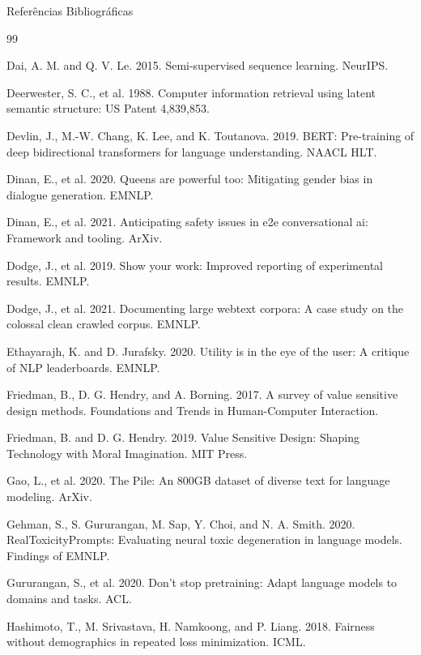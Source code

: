 \documentclass[aspectratio=169]{beamer}
\begin{document}
\begin{frame}[allowframebreaks]{Referências Bibliográficas}
\begin{thebibliography}{99}
{     Dai, A. M. and Q. V. Le. 2015. Semi-supervised sequence learning. NeurIPS.
    
     Deerwester, S. C., et al. 1988. Computer information retrieval using latent semantic structure: US Patent 4,839,853.
    
     Devlin, J., M.-W. Chang, K. Lee, and K. Toutanova. 2019. BERT: Pre-training of deep bidirectional transformers for language understanding. NAACL HLT.
    
     Dinan, E., et al. 2020. Queens are powerful too: Mitigating gender bias in dialogue generation. EMNLP.
    
     Dinan, E., et al. 2021. Anticipating safety issues in e2e conversational ai: Framework and tooling. ArXiv.
    
     Dodge, J., et al. 2019. Show your work: Improved reporting of experimental results. EMNLP.
    
     Dodge, J., et al. 2021. Documenting large webtext corpora: A case study on the colossal clean crawled corpus. EMNLP.
    
     Ethayarajh, K. and D. Jurafsky. 2020. Utility is in the eye of the user: A critique of NLP leaderboards. EMNLP.
    
     Friedman, B., D. G. Hendry, and A. Borning. 2017. A survey of value sensitive design methods. Foundations and Trends in Human-Computer Interaction.
    
     Friedman, B. and D. G. Hendry. 2019. Value Sensitive Design: Shaping Technology with Moral Imagination. MIT Press.
    
     Gao, L., et al. 2020. The Pile: An 800GB dataset of diverse text for language modeling. ArXiv.
    
     Gehman, S., S. Gururangan, M. Sap, Y. Choi, and N. A. Smith. 2020. RealToxicityPrompts: Evaluating neural toxic degeneration in language models. Findings of EMNLP.
    
     Gururangan, S., et al. 2020. Don’t stop pretraining: Adapt language models to domains and tasks. ACL.
    
     Hashimoto, T., M. Srivastava, H. Namkoong, and P. Liang. 2018. Fairness without demographics in repeated loss minimization. ICML.
    
}
\end{thebibliography}
\end{frame}
\end{document}
